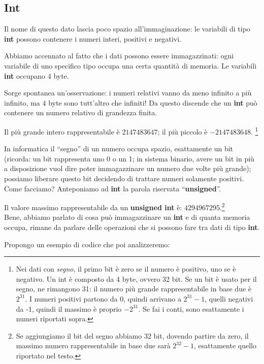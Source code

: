 	\subsection{Int}
	Il nome di questo dato lascia poco spazio all'immaginazione: le variabili di tipo \textbf{int} possono contenere i numeri interi, positivi e negativi.
	
	Abbiamo accennato al fatto che i dati possono essere immagazzinati: ogni variabile di uno specifico tipo occupa una certa quantità di memoria. Le variabili \textbf{int} occupano $4$ byte. 
	
	Sorge spontanea un'osservazione: i numeri relativi vanno da meno infinito a più infinito, ma $4$ byte sono tutt'altro che infiniti! Da questo discende che un	\textbf{int} può contenere un numero relativo di grandezza finita. 
	
	Il più grande intero rappresentabile è $2147483647$; il più piccolo è $-2147483648$. \footnote{Nei dati con \emph{segno}, il primo bit è zero se il numero è positivo, uno se è negativo. Un int è composto da 4 byte, ovvero 32 bit. Se un bit è usato per il segno, ne rimangono 31: il numero più grande rappresentabile in base due è $2^{31}$. I numeri positivi partono da 0, quindi arrivano a $2^{31}-1$, quelli negativi da -1, quindi il massimo è proprio $-2^{31}$. Se fai i conti, sono esattamente i numeri riportati sopra.}
	
	In informatica il ``segno'' di un numero occupa spazio, esattamente un bit (ricorda: un bit rappresenta uno 0 o un 1; in sistema binario, avere un bit in più a disposizione vuol dire poter immagazzinare un numero due volte più grande); possiamo liberare questo bit decidendo di trattare numeri solamente positivi. Come facciamo? Anteponiamo ad \textbf{int} la parola riservata ``\textbf{unsigned}''. 
	
	Il valore massimo rappresentabile da un \textbf{unsigned int} è: $4294967295$.\footnote{Se aggiungiamo il bit del segno abbiamo 32 bit, dovendo partire da zero, il massimo numero rappresentabile in base due sarà $2^{32}-1$, esattamente quello riportato nel testo. }\\
	
	Bene, abbiamo parlato di cosa può immagazzinare un \textbf{int} e di quanta memoria occupa, rimane da parlare delle operazioni che si possono fare tra dati di tipo \textbf{int}.
	
	Propongo un esempio di codice che poi analizzeremo:
	
